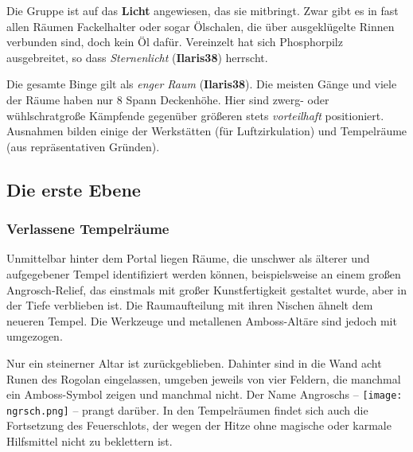 
Die Gruppe ist auf das \textbf{Licht} angewiesen, das sie mitbringt.
Zwar gibt es in fast allen Räumen Fackelhalter oder sogar Ölschalen, die über ausgeklügelte Rinnen verbunden sind, doch kein Öl dafür.
Vereinzelt hat sich Phosphorpilz ausgebreitet, so dass \emph{Sternenlicht} (\textbf{Ilaris38}) herrscht.

Die gesamte Binge gilt als \emph{enger Raum} (\textbf{Ilaris38}).
Die meisten Gänge und viele der Räume haben nur 8 Spann Deckenhöhe. Hier sind zwerg- oder wühlschratgroße Kämpfende gegenüber größeren stets \emph{vorteilhaft} positioniert.
Ausnahmen bilden einige der Werkstätten (für Luftzirkulation) und  Tempelräume (aus repräsentativen Gründen).


\subsection{Die erste Ebene}

\subsubsection{Verlassene Tempelräume}
Unmittelbar hinter dem Portal liegen Räume, die unschwer als älterer und aufgegebener Tempel identifiziert werden können,
beispielsweise an einem großen Angrosch-Relief, das einstmals mit großer Kunstfertigkeit gestaltet wurde, aber in der Tiefe verblieben ist.
Die Raumaufteilung mit ihren Nischen ähnelt dem neueren Tempel. Die Werkzeuge und metallenen Amboss-Altäre sind jedoch mit umgezogen.

Nur ein steinerner Altar ist zurückgeblieben. Dahinter sind in die Wand acht Runen des Rogolan eingelassen, umgeben jeweils von vier Feldern, die manchmal ein Amboss-Symbol zeigen und manchmal nicht.
Der Name Angroschs -- \texttt{[image: ngrsch.png]} --
prangt darüber.
In den Tempelräumen findet sich auch die Fortsetzung des Feuerschlots, der wegen der Hitze ohne magische oder karmale Hilfsmittel nicht zu beklettern ist.

